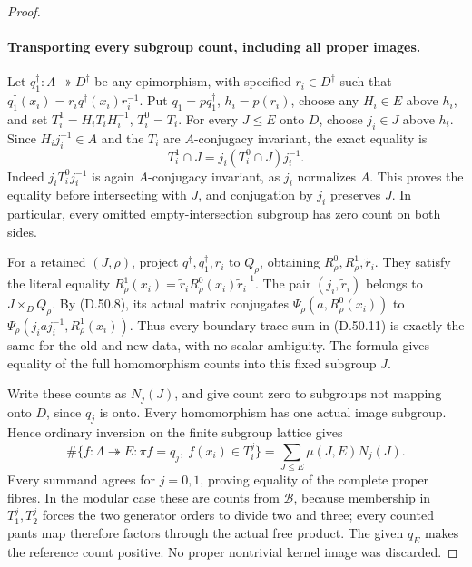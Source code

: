 \begin{proof}
\paragraph{Transporting every subgroup count, including all proper images.}
Let \(q_1^\dagger:\Lambda\twoheadrightarrow D^\dagger\) be any
epimorphism, with specified \(r_i\in D^\dagger\) such that
\(q_1^\dagger(x_i)=r_iq^\dagger(x_i)r_i^{-1}\).
Put \(q_1=pq_1^\dagger\), \(h_i=p(r_i)\), choose any
\(H_i\in E\) above \(h_i\), and set
\(T_i^1=H_iT_iH_i^{-1}\), \(T_i^0=T_i\).
For every \(J\leq E\) onto \(D\), choose \(j_i\in J\) above
\(h_i\). Since \(H_ij_i^{-1}\in A\) and the \(T_i\) are
\(A\)-conjugacy invariant, the exact equality is
\[
                 T_i^1\cap J=j_i(T_i^0\cap J)j_i^{-1}.
 \tag{D.50.15}
\]
Indeed \(j_iT_i^0j_i^{-1}\) is again \(A\)-conjugacy invariant,
as \(j_i\) normalizes \(A\). This proves the equality before
intersecting with \(J\), and conjugation by \(j_i\) preserves \(J\).
In particular, every omitted empty-intersection subgroup has
zero count on both sides.

For a retained \((J,\rho)\), project \(q^\dagger,q_1^\dagger,r_i\)
to \(Q_\rho\), obtaining \(R_\rho^0,R_\rho^1,\widetilde r_i\).
They satisfy the literal equality
\(R_\rho^1(x_i)=\widetilde r_iR_\rho^0(x_i)\widetilde r_i^{-1}\).
The pair \((j_i,\widetilde r_i)\) belongs to
\(J\times_DQ_\rho\). By \textup{(D.50.8)}, its actual matrix
conjugates
\(\Psi_\rho(a,R_\rho^0(x_i))\) to
\(\Psi_\rho(j_i a j_i^{-1},R_\rho^1(x_i))\).
Thus every boundary trace sum in \textup{(D.50.11)} is exactly
the same for the old and new data, with no scalar ambiguity.
The formula gives equality of the full homomorphism counts
into this fixed subgroup \(J\).

Write these counts as \(N_j(J)\), and give count zero to
subgroups not mapping onto \(D\), since \(q_j\) is onto.
Every homomorphism has one actual image subgroup. Hence
ordinary inversion on the finite subgroup lattice gives
\[
 \#\{f:\Lambda\twoheadrightarrow E:\pi f=q_j,
                     \ f(x_i)\in T_i^j\}
       =\sum_{J\leq E}\mu(J,E)N_j(J).
 \tag{D.50.16}
\]
Every summand agrees for \(j=0,1\), proving equality of the
complete proper fibres. In the modular case these are counts
from \(\mathcal B\), because membership in \(T_1^j,T_2^j\)
forces the two generator orders to divide two and three;
every counted pants map therefore factors through the actual
free product. The given \(q_E\) makes the reference count
positive. No proper nontrivial kernel image was discarded.


\end{proof}
